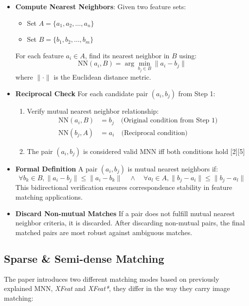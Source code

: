 \begin{itemize}
    \item \textbf{Compute Nearest Neighbors}: Given two feature sets:
          \begin{itemize}
              \item Set $A = \{a_1, a_2, \ldots, a_n\}$
              \item Set $B = \{b_1, b_2, \ldots, b_m\}$
          \end{itemize}
          For each feature $a_i \in A$, find its nearest neighbor in $B$ using:
          \[
              \text{NN}(a_i, B) = \arg\min_{b_j \in B} \|a_i - b_j\|
          \]
          where $\| \cdot \|$ is the Euclidean distance metric.
    \item \textbf{Reciprocal Check}
          For each candidate pair $(a_i, b_j)$ from Step 1:
          \begin{enumerate}
              \item Verify mutual nearest neighbor relationship:
                    \begin{align*}
                        \text{NN}(a_i, B) & = b_j \quad \text{(Original condition from Step 1)} \\
                        \text{NN}(b_j, A) & = a_i \quad \text{(Reciprocal condition)}
                    \end{align*}
              \item The pair $(a_i, b_j)$ is considered valid MNN iff both conditions hold [2][5]
          \end{enumerate}
    \item \textbf{Formal Definition}
          A pair $(a_i, b_j)$ is mutual nearest neighbors if:
          \[
              \forall b_k \in B, \|a_i - b_j\| \leq \|a_i - b_k\| \quad \land \quad \forall a_l \in A, \|b_j - a_i\| \leq \|b_j - a_l\|
          \]
          This bidirectional verification ensures correspondence stability in feature
          matching applications.
    \item \textbf{Discard Non-mutual Matches}
          If a pair does not fulfill mutual nearest neighbor criteria, it is discarded.
          After discarding non-mutual pairs, the final matched pairs are most robust against ambiguous matches.
\end{itemize}
\subsection{Sparse \& Semi-dense Matching}
The paper introduces two different matching modes based on previously explained
MNN, \textit{XFeat} and \textit{XFeat*}, they differ in the way they carry
image matching: \\

